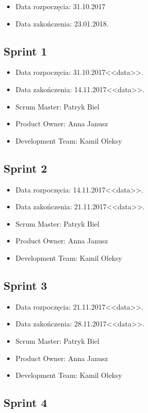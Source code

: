 \documentclass[a4paper]{article}
\begin{document}
\begin{itemize}
\item Data rozpoczęcia: 31.10.2017
\item  Data zakończenia: 23.01.2018.
\end{itemize}

\subsection{Sprint 1}

\begin{itemize}
\item Data rozpoczęcia:  31.10.2017<<data>>.
\item Data zakończenia: 14.11.2017<<data>>.
\item Scrum Master: Patryk Biel
\item Product Owner: Anna Janusz
\item Development Team: Kamil Oleksy
\end{itemize}

\subsection{Sprint 2}

\begin{itemize}
\item Data rozpoczęcia: 14.11.2017<<data>>.
\item  Data zakończenia: 21.11.2017<<data>>.
\item Scrum Master: Patryk Biel
\item Product Owner: Anna Janusz
\item Development Team: Kamil Oleksy
\end{itemize}

\subsection{Sprint 3}

\begin{itemize}
\item Data rozpoczęcia: 21.11.2017<<data>>.
\item  Data zakończenia: 28.11.2017<<data>>.
\item Scrum Master: Patryk Biel
\item Product Owner: Anna Janusz
\item Development Team: Kamil Oleksy
\end{itemize}

\subsection{Sprint 4}
\end{document}

